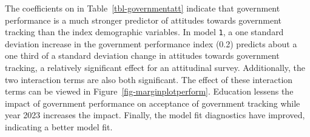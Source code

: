 \documentclass[
  letterpaper,
  DIV=11,
  numbers=noendperiod]{scrartcl}
\begin{document}
The coefficients on in Table~\ref{tbl-governmentatt} indicate that
government performance is a much stronger predictor of attitudes towards
government tracking than the index demographic variables. In model
\texttt{1}, a one standard deviation increase in the government
performance index (0.2) predicts about a one third of a standard
deviation change in attitudes towards government tracking, a relatively
significant effect for an attitudinal survey. Additionally, the two
interaction terms are also both significant. The effect of these
interaction terms can be viewed in Figure~\ref{fig-marginplotperform}.
Education lessens the impact of government performance on acceptance of
government tracking while year 2023 increases the impact. Finally, the
model fit diagnostics have improved, indicating a better model fit.

\begin{figure}

\end{figure}
\end{document}
